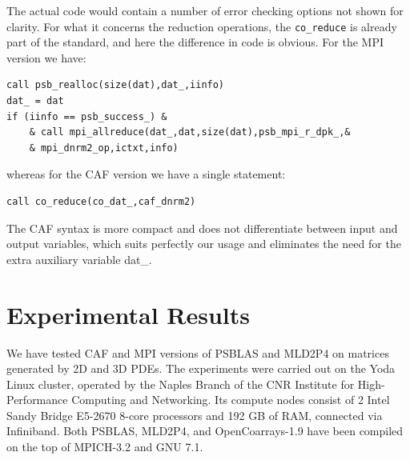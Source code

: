 \documentclass{IOS-Book-Article}
\begin{document}
\fi
The actual code would contain a number of error checking options %
not shown for clarity.
For what it concerns the reduction operations, the \verb|co_reduce| is
already part of the standard, and here the difference in code is
obvious. For the  MPI version we have:
\begin{center}
{\small
\begin{lstlisting}
call psb_realloc(size(dat),dat_,iinfo)
dat_ = dat
if (iinfo == psb_success_) &
    & call mpi_allreduce(dat_,dat,size(dat),psb_mpi_r_dpk_,&
    & mpi_dnrm2_op,ictxt,info)

\end{lstlisting}}
\end{center}
whereas for  the CAF version we have a single statement: 
\begin{center}
{\small
\begin{lstlisting}
call co_reduce(co_dat_,caf_dnrm2)
\end{lstlisting}}
\end{center}
The CAF syntax is more compact and does not differentiate between
input and output variables, which suits perfectly our usage and
eliminates the need for  the extra auxiliary variable dat\_. 



\section{Experimental Results} \label{sec:results}

We have tested CAF and MPI versions of PSBLAS and MLD2P4 on matrices
generated by 2D and 3D PDEs. 
The experiments were carried out on the Yoda Linux cluster, operated
by the Naples Branch of the CNR Institute for High-Performance
Computing and Networking. Its compute nodes consist of 2 Intel Sandy
Bridge E5-2670 8-core processors and 192 GB of RAM, connected via
Infiniband. 
Both PSBLAS, MLD2P4, and OpenCoarrays-1.9 have been compiled on the top
of MPICH-3.2 and GNU 7.1. 
\end{document}
